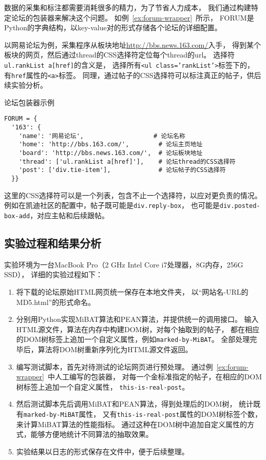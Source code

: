数据的采集和标注都需要消耗很多的精力，为了节省人力成本，
我们通过构建特定论坛的包装器来解决这个问题。
如例~\ref{ex:forum-wrapper}~所示，
FORUM是Python的字典结构，以key-value对的形式存储各个论坛的详细配置。

以网易论坛为例，采集程序从板块地址\url{http://bbs.news.163.com/}入手，
得到某个板块的网页，然后通过thread的CSS选择符定位每个thread的url。
选择符\texttt{ul.rankList a[href]}的含义是，
选择所有\texttt{<ul class='rankList'>}标签下的，
有\texttt{href}属性的\texttt{<a>}标签。
同理，通过帖子的CSS选择符可以标注真正的帖子，供后续实验分析。

\begin{example}
\label{ex:forum-wrapper}
论坛包装器示例
\end{example}
\begin{oframed}
\begin{verbatim}
FORUM = {
  '163': {
    'name': '网易论坛',                   # 论坛名称
    'home': 'http://bbs.163.com/',        # 论坛主页地址
    'board': 'http://bbs.news.163.com/',  # 论坛板块地址
    'thread': ['ul.rankList a[href]'],    # 论坛thread的CSS选择符 
    'post': ['div.tie-item'],             # 论坛帖子的CSS选择符
  }}
\end{verbatim}
\end{oframed}

这里的CSS选择符可以是一个列表，包含不止一个选择符，以应对更负责的情况。
例如在凯迪社区的配置中，帖子既可能是\texttt{div.reply-box}，
也可能是\texttt{div.posted-box-add}，对应主帖和后续跟帖。

\subsection{实验过程和结果分析}

实验环境为一台MacBook Pro（2 GHz Intel Core i7处理器，8G内存，256G SSD），
详细的实验过程如下：
\begin{enumerate}
\item 将下载的论坛原始HTML网页统一保存在本地文件夹，
以“网站名-URL的MD5.html”的形式命名。
\item 分别用Python实现MiBAT算法和PEAN算法，并提供统一的调用接口。
输入HTML源文件，算法在内存中构建DOM树，对每个抽取到的帖子，
都在相应的DOM树标签上追加一个自定义属性，例如\texttt{marked-by-MiBAT}。
全部处理完毕后，算法将DOM树重新序列化为HTML源文件返回。
\item 编写测试脚本，首先对待测试的论坛网页进行预处理。
通过例~\ref{ex:forum-wrapper}~中人工编写的包装器，
对每一个金标准指定的帖子，在相应的DOM树标签上追加一个自定义属性，
\texttt{this-is-real-post}。
\item 然后测试脚本先后调用MiBAT和PEAN算法，得到处理后的DOM树，
统计既有\texttt{marked-by-MiBAT}属性，
又有\texttt{this-is-real-post}属性的DOM树标签个数，来计算MiBAT算法的性能指标。
通过这种在DOM树中追加自定义属性的方式，能够方便地统计不同算法的抽取效果。
\item 实验结果以日志的形式保存在文件中，便于后续整理。
\end{enumerate}

